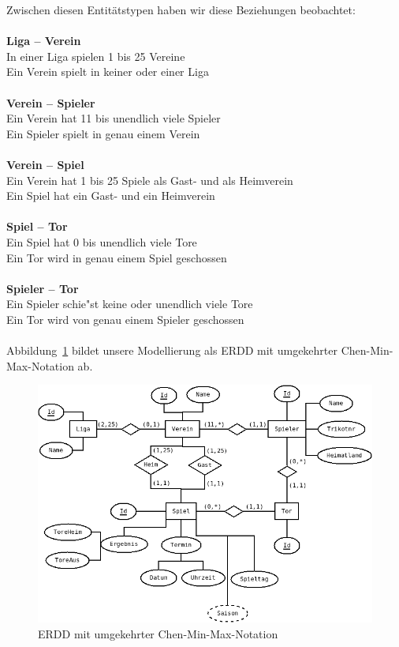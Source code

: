 \documentclass[
10pt,
a4paper
]{scrartcl}
\begin{document}
Zwischen diesen Entitätstypen haben wir diese Beziehungen beobachtet:\\
\\
\textbf{Liga – Verein}\\
In einer Liga spielen 1 bis 25 Vereine\\
Ein Verein spielt in keiner oder einer Liga\\
\\
\textbf{Verein – Spieler}\\
Ein Verein hat 11 bis unendlich viele Spieler\\
Ein Spieler spielt in genau einem Verein\\
\\
\textbf{Verein – Spiel}\\
Ein Verein hat 1 bis 25 Spiele als Gast- und als Heimverein\\
Ein Spiel hat ein Gast- und ein Heimverein\\
\\
\textbf{Spiel – Tor}\\
Ein Spiel hat 0 bis unendlich viele Tore\\
Ein Tor wird in genau einem Spiel geschossen \\
\\
\textbf{Spieler – Tor}\\
Ein Spieler schie"st keine oder unendlich viele Tore\\
Ein Tor wird von genau einem Spieler geschossen \\ 
\\

Abbildung~\ref{fig1} bildet unsere Modellierung als ERDD mit umgekehrter Chen-Min-Max-Notation ab.

\begin{figure}[hb]
	\centering
  \includegraphics[scale=0.5]{bundesliga_iter1.png}
	\caption{ERDD mit umgekehrter Chen-Min-Max-Notation}
	\label{fig1}
\end{figure}
\end{document}

